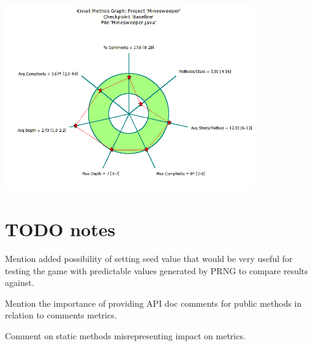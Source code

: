\documentclass[UKenglish]{article}  %
\begin{document}
\includegraphics[height=8cm]{Minesweeper_java-kiviat-metrics-graph-original.png}

\section{TODO notes}
Mention added possibility of setting seed value that would be very useful for
testing the game with predictable values generated by PRNG to compare results
against.


Mention the importance of providing API doc comments for public methods in
relation to comments metrics.


Comment on static methods misrepresenting impact on metrics.
\end{document}
